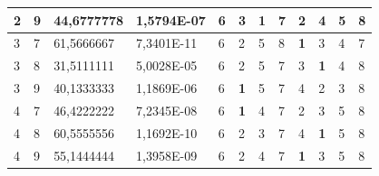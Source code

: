\documentclass[conference]{IEEEtran}
\begin{document}
\begin{table}[]
\begin{tabular}{|llll|llllllll|}
		\multicolumn{1}{|l|}{2}   & \multicolumn{1}{l|}{9}         & \multicolumn{1}{l|}{44,6777778}    & 1,5794E-07 & \multicolumn{1}{l|}{6}   & \multicolumn{1}{l|}{3}          & \multicolumn{1}{l|}{\textbf{1}} & \multicolumn{1}{l|}{7}   & \multicolumn{1}{l|}{2}          & \multicolumn{1}{l|}{4}          & \multicolumn{1}{l|}{5}          & 8                      \\ \hline
		\multicolumn{1}{|l|}{3}   & \multicolumn{1}{l|}{7}         & \multicolumn{1}{l|}{61,5666667}    & 7,3401E-11 & \multicolumn{1}{l|}{6}   & \multicolumn{1}{l|}{2}          & \multicolumn{1}{l|}{5}          & \multicolumn{1}{l|}{8}   & \multicolumn{1}{l|}{\textbf{1}} & \multicolumn{1}{l|}{3}          & \multicolumn{1}{l|}{4}          & 7                      \\ \hline
		\multicolumn{1}{|l|}{3}   & \multicolumn{1}{l|}{8}         & \multicolumn{1}{l|}{31,5111111}    & 5,0028E-05 & \multicolumn{1}{l|}{6}   & \multicolumn{1}{l|}{2}          & \multicolumn{1}{l|}{5}          & \multicolumn{1}{l|}{7}   & \multicolumn{1}{l|}{3}          & \multicolumn{1}{l|}{\textbf{1}} & \multicolumn{1}{l|}{4}          & 8                      \\ \hline
		\multicolumn{1}{|l|}{3}   & \multicolumn{1}{l|}{9}         & \multicolumn{1}{l|}{40,1333333}    & 1,1869E-06 & \multicolumn{1}{l|}{6}   & \multicolumn{1}{l|}{\textbf{1}} & \multicolumn{1}{l|}{5}          & \multicolumn{1}{l|}{7}   & \multicolumn{1}{l|}{4}          & \multicolumn{1}{l|}{2}          & \multicolumn{1}{l|}{3}          & 8                      \\ \hline
		\multicolumn{1}{|l|}{4}   & \multicolumn{1}{l|}{7}         & \multicolumn{1}{l|}{46,4222222}    & 7,2345E-08 & \multicolumn{1}{l|}{6}   & \multicolumn{1}{l|}{\textbf{1}} & \multicolumn{1}{l|}{4}          & \multicolumn{1}{l|}{7}   & \multicolumn{1}{l|}{2}          & \multicolumn{1}{l|}{3}          & \multicolumn{1}{l|}{5}          & 8                      \\ \hline
		\multicolumn{1}{|l|}{4}   & \multicolumn{1}{l|}{8}         & \multicolumn{1}{l|}{60,5555556}    & 1,1692E-10 & \multicolumn{1}{l|}{6}   & \multicolumn{1}{l|}{2}          & \multicolumn{1}{l|}{3}          & \multicolumn{1}{l|}{7}   & \multicolumn{1}{l|}{4}          & \multicolumn{1}{l|}{\textbf{1}} & \multicolumn{1}{l|}{5}          & 8                      \\ \hline
		\multicolumn{1}{|l|}{4}   & \multicolumn{1}{l|}{9}         & \multicolumn{1}{l|}{55,1444444}    & 1,3958E-09 & \multicolumn{1}{l|}{6}   & \multicolumn{1}{l|}{2}          & \multicolumn{1}{l|}{4}          & \multicolumn{1}{l|}{7}   & \multicolumn{1}{l|}{\textbf{1}} & \multicolumn{1}{l|}{3}          & \multicolumn{1}{l|}{5}          & 8                      \\ \hline

\end{tabular}
\end{table}
\end{document}
